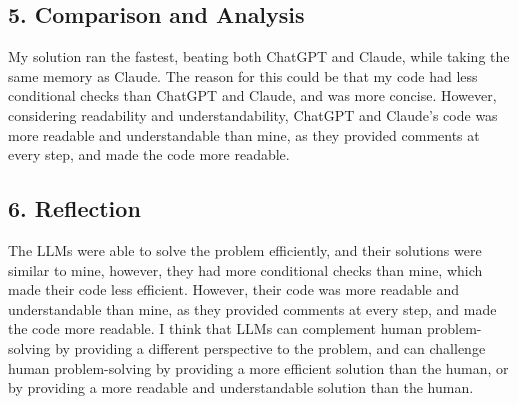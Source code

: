 \documentclass{article}
\theoremstyle{mytheoremstyle}
\theoremstyle{mytheoremstyle}
\theoremstyle{myproblemstyle}
\begin{document}
\subsection*{5. Comparison and Analysis}

My solution ran the fastest, beating both ChatGPT and Claude, while taking the same memory as Claude. The reason for this could be that my code had less conditional checks than ChatGPT and Claude, and was more concise. However, considering readability and understandability, ChatGPT and Claude's code was more readable and understandable than mine, as they provided comments at every step, and made the code more readable.

\subsection*{6. Reflection}

The LLMs were able to solve the problem efficiently, and their solutions were similar to mine, however, they had more conditional checks than mine, which made their code less efficient. However, their code was more readable and understandable than mine, as they provided comments at every step, and made the code more readable. I think that LLMs can complement human problem-solving by providing a different perspective to the problem, and can challenge human problem-solving by providing a more efficient solution than the human, or by providing a more readable and understandable solution than the human.
\end{document}
